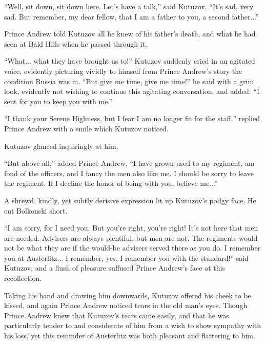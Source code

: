 ``Well, sit down, sit down here. Let's have a talk,'' said
Kutuzov. ``It's sad, very sad. But remember, my dear fellow, that
I am a father to you, a second father...''

Prince Andrew told Kutuzov all he knew of his father's death, and
what he had seen at Bald Hills when he passed through it.

``What... what they have brought us to!'' Kutuzov suddenly cried
in an agitated voice, evidently picturing vividly to himself from
Prince Andrew's story the condition Russia was in. ``But give me
time, give me time!'' he said with a grim look, evidently not
wishing to continue this agitating conversation, and added: ``I
sent for you to keep you with me.''

``I thank your Serene Highness, but I fear I am no longer fit for
the staff,'' replied Prince Andrew with a smile which Kutuzov
noticed.

Kutuzov glanced inquiringly at him.

``But above all,'' added Prince Andrew, ``I have grown used to my
regiment, am fond of the officers, and I fancy the men also like
me. I should be sorry to leave the regiment. If I decline the
honor of being with you, believe me...''

A shrewd, kindly, yet subtly derisive expression lit up Kutuzov's
podgy face. He cut Bolkonski short.

``I am sorry, for I need you. But you're right, you're right!
It's not here that men are needed. Advisers are always plentiful,
but men are not. The regiments would not be what they are if the
would-be advisers served there as you do. I remember you at
Austerlitz... I remember, yes, I remember you with the
standard!'' said Kutuzov, and a flush of pleasure suffused Prince
Andrew's face at this recollection.

Taking his hand and drawing him downwards, Kutuzov offered his
cheek to be kissed, and again Prince Andrew noticed tears in the
old man's eyes.  Though Prince Andrew knew that Kutuzov's tears
came easily, and that he was particularly tender to and
considerate of him from a wish to show sympathy with his loss,
yet this reminder of Austerlitz was both pleasant and flattering
to him.


